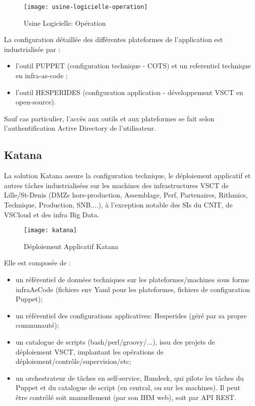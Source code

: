\begin{figure}[ht]
 \centering
 \texttt{[image: usine-logicielle-operation]}
 \caption{Usine Logicielle: Opération}
\end{figure}

La configuration détaillée des différentes plateformes de l'application est industrialisée par :
\begin{itemize}
 \item l'outil PUPPET (configuration technique - COTS) et un referentiel technique en infra-as-code ;
 \item l'outil HESPERIDES (configuration application - développement VSCT en open-source).
\end{itemize}

Sauf cas particulier, l'accès aux outils et aux plateformes se fait selon l'authentification Active Directory de l'utilisateur.
\subsection{Katana}

La solution Katana assure la configuration technique, le déploiement applicatif et autres tâches industrialisées sur les machines des infrastructures VSCT de Lille/St-Denis (DMZs hors-production, Assemblage, Perf, Partenaires, Rithmics, Technique, Production, SNB....), à l'exception notable des SIs du CNIT, de VSCloud et des infra Big Data.

\begin{figure}[ht]
 \centering
 \texttt{[image: katana]}
 \caption{Déploiement Applicatif Katana}
\end{figure}

Elle est composée de :

\begin{itemize}
 \item un référentiel de données techniques sur les plateformes/machines sous forme infraAsCode (fichiers env Yaml pour les plateformes, fichiers de configuration Puppet);
 \item un référentiel des configurations applicatives: Hesperides (géré par sa propre communauté);
 \item un catalogue de scripts (bash/perl/groovy/...), issu des projets de déploiement VSCT, implantant les opérations de déploiement/contrôle/supervision/etc;
 \item un orchestrateur de tâches en self-service, Rundeck, qui pilote les tâches du Puppet et du catalogue de script (en central, ou sur les machines). Il peut être contrôlé soit manuellement (par son IHM web), soit par API REST.
\end{itemize}

